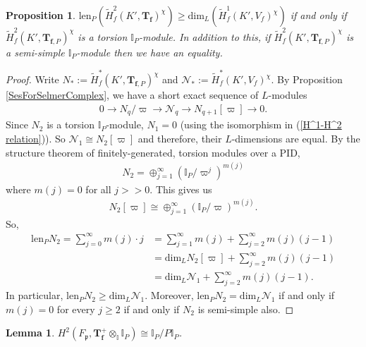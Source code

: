 \documentclass[reqno,10pt]{amsart}
\newcommand{\I}{\mathbb{I}}
\newcommand{\f}{\mathbf{f}}
\newcommand{\T}{\mathbf{T}}
\newcommand{\p}{\mathfrak{p}}
\newcommand{\vp}{\varpi}
\theoremstyle{plain}
\newtheorem{lem}[thm]{Lemma}
\newtheorem{prop}[thm]{Proposition}
\theoremstyle{definition}
\begin{document}
\begin{prop} \label{length dim equality}
    $\mathrm{len}_P(\widetilde{H}^2_f(K',\T_\f)^\chi) \geq \mathrm{dim}_L(\widetilde{H}^1_f(K',V_f)^\chi)$ if and only if $\widetilde{H}^2_f(K',\T_{\f,P})^\chi$ is a torsion $\I_P$-module. In addition to this, if $\widetilde{H}^2_f(K',\T_{\f,P})^\chi$ is a semi-simple $\I_P$-module then we have an equality.
\end{prop}

\begin{proof}
    Write $N_* := \widetilde{H}^*_f(K',\T_{\f,P})^\chi$ and $\mathcal{N}_* := \widetilde{H}^*_f(K',V_f)^\chi$. By Proposition \ref{SesForSelmerComplex}, we have a short exact sequence of $L$-modules
    \begin{align*}
        0 \rightarrow N_q/\vp \rightarrow \mathcal{N}_q \rightarrow N_{q+1}[\vp] \rightarrow 0.
    \end{align*}
    Since $N_2$ is a torsion $\I_P$-module, $N_1 = 0$ (using the isomorphism in (\ref{H^1-H^2 relation})). So $\mathcal{N}_1 \cong N_2[\vp]$ and therefore, their $L$-dimensions are equal. By the structure theorem of finitely-generated, torsion modules over a PID, 
    \begin{align*}
        N_2 = \oplus_{j=1}^{\infty} (\I_P/\vp^j)^{m(j)}
    \end{align*}
    where $m(j) = 0$ for all $j >> 0$. This gives us
    \begin{align*}
        N_2[\vp] \cong \oplus_{j=1}^{\infty} (\I_P/\vp)^{m(j)}.
    \end{align*}
    So,
    \begin{align*}
        \mathrm{len}_P N_2 = \sum_{j = 0}^{\infty} m(j) \cdot j & = \sum_{j = 1}^{\infty} m(j) + \sum_{j = 2}^{\infty} m(j)(j-1) \\
        & = \mathrm{dim}_L N_2[\vp] + \sum_{j = 2}^{\infty} m(j)(j-1) \\
        & = \mathrm{dim}_L \mathcal{N}_1 + \sum_{j = 2}^{\infty} m(j)(j-1).
    \end{align*}
    In particular, $\mathrm{len}_P N_2 \geq \mathrm{dim}_L \mathcal{N}_1$. Moreover, $\mathrm{len}_P N_2 = \mathrm{dim}_L \mathcal{N}_1$ if and only if $m(j) = 0$ for every $j \geq 2$ if and only if $N_2$ is semi-simple also. 
\end{proof}

\begin{lem} \label{lem7.5}
    $H^2(F_\p,\T_\f^+ \otimes_\I \I_P) \cong \I_P/P\I_P$.
\end{lem}
\end{document}
